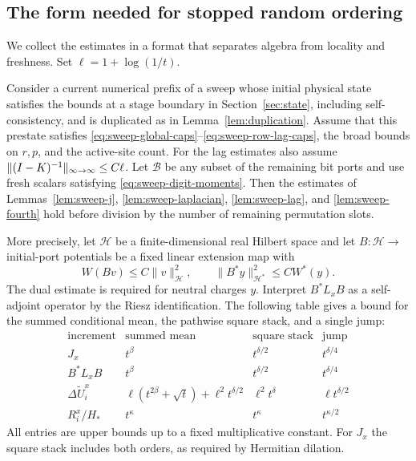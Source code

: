 \subsection{The form needed for stopped random ordering}

We collect the estimates in a format that separates algebra from
locality and freshness. Set $\ell=1+\log(1/t)$.

\begin{proposition}\label{prop:sweep-increments}
Consider a current numerical prefix of a sweep whose initial physical
state satisfies the bounds at a stage boundary in Section~\ref{sec:state},
including self-consistency, and is duplicated as in
Lemma~\ref{lem:duplication}. Assume that this prestate satisfies
\eqref{eq:sweep-global-caps}--\eqref{eq:sweep-row-lag-caps},
the broad bounds on $r,p$, and the active-site count.
For the lag estimates also assume
$\|(I-K)^{-1}\|_{\infty\to\infty}\le C\ell$.
Let $\mathcal B$ be any subset of the remaining bit ports and use
fresh scalars satisfying \eqref{eq:sweep-digit-moments}.
Then the estimates of Lemmas~\ref{lem:sweep-j},
\ref{lem:sweep-laplacian}, \ref{lem:sweep-lag}, and
\ref{lem:sweep-fourth} hold before division by the number of remaining
permutation slots.

More precisely, let $\mathcal H$ be a finite-dimensional real Hilbert
space and let $B:\mathcal H\to$ initial-port potentials be a fixed
linear extension map with
\[
 W(Bv)\le C\|v\|_{\mathcal H}^2,\qquad
 \|B^*y\|_{\mathcal H^*}^2\le CW^*(y).
\]
The dual estimate is required for neutral charges $y$.
Interpret $B^*L_xB$ as a self-adjoint operator by the Riesz
identification. The following table gives a bound for the summed
conditional mean, the pathwise square stack, and a single jump:
\[
\begin{array}{c|c|c|c}
 \text{increment}&\text{summed mean}&\text{square stack}&\text{jump}\\ \hline
 J_x&t^\beta&t^{\delta/2}&t^{\delta/4}\\
 B^*L_xB&t^\beta&t^{\delta/2}&t^{\delta/4}\\
 \Delta\widetilde U_i^x&
 \ell(t^{2\beta}+\sqrt t)+\ell^2t^{\delta/2}&
 \ell^2t^\delta&\ell t^{\delta/2}\\
 R_i^x/H_*&t^\kappa&t^\kappa&t^{\kappa/2}
\end{array}
\]
All entries are upper bounds up to a fixed multiplicative constant.
For $J_x$ the square stack includes both orders, as required by
Hermitian dilation.
\end{proposition}

